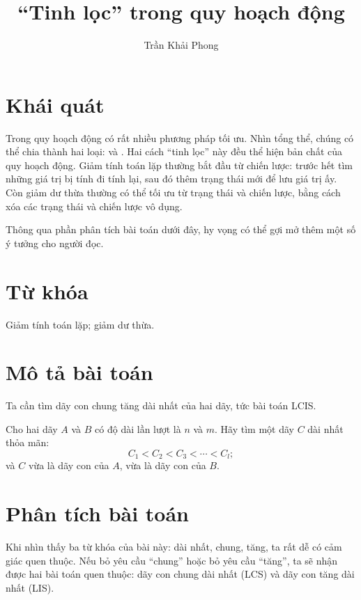 \documentclass[11pt]{article}
\title{``Tinh lọc'' trong quy hoạch động}
\author{Trần Khải Phong}
\date{}
\begin{document}
\maketitle


\section*{Khái quát}

Trong quy hoạch động có rất nhiều phương pháp tối ưu. Nhìn tổng thể, chúng có
thể chia thành hai loại:  và . Hai
cách ``tinh lọc'' này đều thể hiện bản chất của quy hoạch động. Giảm tính toán
lặp thường bắt đầu từ chiến lược: trước hết tìm những giá trị bị tính đi tính
lại, sau đó thêm trạng thái mới để lưu giá trị ấy. Còn giảm dư thừa thường có
thể tối ưu từ trạng thái và chiến lược, bằng cách xóa các trạng thái và chiến
lược vô dụng.

Thông qua phần phân tích bài toán dưới đây, hy vọng có thể gợi mở thêm một số
ý tưởng cho người đọc.

\section*{Từ khóa}

Giảm tính toán lặp; giảm dư thừa.

\section{Mô tả bài toán}

Ta cần tìm dãy con chung tăng dài nhất của hai dãy, tức bài toán LCIS.

Cho hai dãy $A$ và $B$ có độ dài lần lượt là $n$ và $m$. Hãy tìm một dãy $C$
dài nhất thỏa mãn:
\[
  C_1<C_2<C_3<\cdots<C_l;
\]
và $C$ vừa là dãy con của $A$, vừa là dãy con của $B$.

\section{Phân tích bài toán}

Khi nhìn thấy ba từ khóa của bài này: dài nhất, chung, tăng, ta rất dễ có cảm
giác quen thuộc. Nếu bỏ yêu cầu ``chung'' hoặc bỏ yêu cầu ``tăng'', ta sẽ nhận
được hai bài toán quen thuộc: dãy con chung dài nhất (LCS) và dãy con tăng dài
nhất (LIS).
\end{document}
